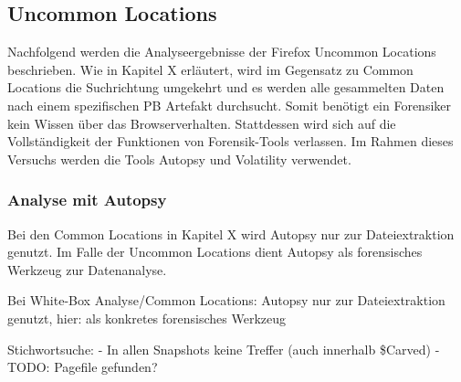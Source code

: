 \subsection*{Uncommon Locations}
			Nachfolgend werden die Analyseergebnisse der Firefox Uncommon Locations beschrieben.
			Wie in Kapitel X erläutert, wird im Gegensatz zu Common Locations die Suchrichtung umgekehrt und es werden alle gesammelten Daten nach einem spezifischen PB Artefakt durchsucht.
			Somit benötigt ein Forensiker kein Wissen über das Browserverhalten. Stattdessen wird sich auf die Vollständigkeit der Funktionen von Forensik-Tools verlassen. Im Rahmen dieses Versuchs werden die Tools Autopsy und Volatility verwendet.

\subsubsection*{Analyse mit Autopsy}

			Bei den Common Locations in Kapitel X wird Autopsy nur zur Dateiextraktion genutzt. Im Falle der Uncommon Locations dient Autopsy als forensisches Werkzeug zur Datenanalyse.

Bei White-Box Analyse/Common Locations: Autopsy nur zur Dateiextraktion genutzt, hier: als konkretes forensisches Werkzeug

Stichwortsuche:
- In allen Snapshots keine Treffer (auch innerhalb \$Carved)
- TODO: Pagefile gefunden?

